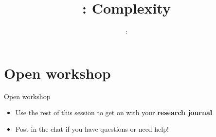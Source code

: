 \usepackage{../../beamerthemeFalmouthGamesAcademy}
\usepackage{multimedia}
\graphicspath{ {../../} }

\lstset{language=[Sharp]C
}

\usepackage[normalem]{ulem}
\usepackage{wasysym}

\usepackage{algpseudocode}

\usepackage{pdfpages}

\usetikzlibrary{arrows,automata}




\hypersetup{
pdftex,
pdftitle=\sessionnumber: Complexity,
pdfauthor=Ed Powley,
pdfdisplaydoctitle,
pdflang=en-GB
}
 

\title{\sessionnumber: Complexity}
\subtitle{\modulecode: \moduletitle}

\frame{\titlepage} 











%

%

\part{Open workshop}
\frame{\partpage}

\begin{frame}{Open workshop}
    \begin{itemize}
        \item Use the rest of this session to get on with your \textbf{research journal}
        \item Post in the chat if you have questions or need help!
    \end{itemize}
\end{frame}


